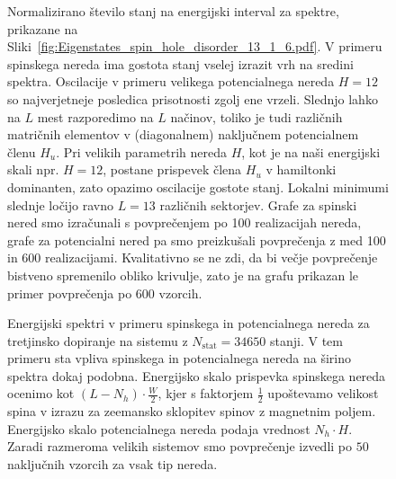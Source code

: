  \begin{figure}[H]
\caption{Normalizirano število stanj na energijski interval za spektre, prikazane na Sliki~\ref{fig:Eigenstates_spin_hole_disorder_13_1_6.pdf}. V primeru spinskega nereda ima gostota stanj vselej izrazit vrh na sredini spektra. Oscilacije v primeru velikega potencialnega nereda $H=12$ so najverjetneje posledica prisotnosti zgolj ene vrzeli. Slednjo lahko na $L$ mest razporedimo na $L$ načinov, toliko je tudi različnih matričnih elementov v (diagonalnem) naključnem potencialnem členu $H_u$. Pri velikih parametrih nereda $H$, kot je na naši energijski skali npr. $H=12$, postane prispevek člena $H_u$ v hamiltonki dominanten, zato opazimo oscilacije gostote stanj. Lokalni minimumi slednje ločijo ravno $L=13$ različnih sektorjev. Grafe za spinski nered smo izračunali s povprečenjem po 100 realizacijah nereda, grafe za potencialni nered pa smo preizkušali povprečenja z med 100 in 600 realizacijami. Kvalitativno se ne zdi, da bi večje povprečenje bistveno spremenilo obliko krivulje, zato je na grafu prikazan le primer povprečenja po 600 vzorcih.}
\label{fig:DOS_spin_hole_disorder_13_1_6.pdf}
\end{figure}
 \begin{figure}[H]
\caption{Energijski spektri v primeru spinskega in potencialnega nereda za tretjinsko dopiranje na sistemu z $N_\mathrm{stat}=34650$ stanji. V tem primeru sta vpliva spinskega in potencialnega nereda na širino spektra dokaj podobna. Energijsko skalo prispevka spinskega nereda ocenimo kot $(L-N_h)\cdot \frac{W}{2}$, kjer s faktorjem $\frac{1}{2}$ upoštevamo velikost spina v izrazu za zeemansko sklopitev spinov z magnetnim poljem. Energijsko skalo potencialnega nereda podaja vrednost $N_h\cdot H$. Zaradi razmeroma velikih sistemov smo povprečenje izvedli po $50$ naključnih vzorcih za vsak tip nereda.   }
\label{fig:Eigenstates_spin_hole_disorder_12_4_4.pdf}
\end{figure}
